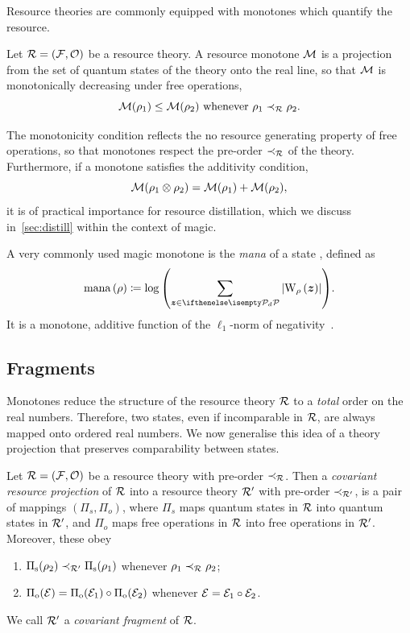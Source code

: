 \documentclass[pra,
aps,
twocolumn,
superscriptaddress,
groupedaddress,
nofootinbib,
reprint
]{revtex4-1}
\begin{document}
Resource theories are commonly equipped with monotones which quantify the resource. 
\begin{definition}\label{def:mono}
    Let $\mathcal{R} = (\mathcal{F}, \mathcal{O})$ be a resource theory.
    A resource monotone $\mathcal{M}$ is a projection from the set of quantum states of the theory onto the real line, so that $\mathcal{M}$ is monotonically decreasing under free operations,
    \begin{equation}
        \mathcal{M}(\rho_1) \leq \mathcal{M}(\rho_2)\ \text{whenever}\ \rho_1 \prec_{\mathcal{R}} \rho_2.
    \end{equation}
\end{definition}
The monotonicity condition reflects the no resource generating property of free operations, so that monotones respect the pre-order $\prec_{\mathcal{R}}$ of the theory.
Furthermore, if a monotone satisfies the additivity condition,
\begin{equation}
    \mathcal{M}(\rho_1 \otimes \rho_2) = \mathcal{M}(\rho_1) + \mathcal{M}(\rho_2),
\end{equation}
it is of practical importance for resource distillation, which we discuss in~\cref{sec:distill} within the context of magic.

A very commonly used magic monotone is the \emph{mana} of a state , defined as
\begin{equation}
    \mana{\rho} \coloneqq \log{\left(\sum\limits_{\bmz \in \pd} \abs{\W[\bmz]{\rho}}\right)}.
\end{equation}
It is a monotone, additive function of the $\ell_1$-norm of negativity~.

\subsection{Fragments}

Monotones reduce the structure of the resource theory $\mathcal{R}$ to a \emph{total} order on the real numbers.
Therefore, two states, even if incomparable in $\mathcal{R}$, are always mapped onto ordered real numbers.
We now generalise this idea of a theory projection that preserves comparability between states. 
\begin{definition}\label{def:covproj}
Let $\mathcal{R} = (\mathcal{F}, \mathcal{O})$ be a resource theory with pre-order $\prec_{\mathcal{R}}$. 
Then a \emph{covariant resource projection} of $\mathcal{R}$ into a resource theory $\mathcal{R}'$ with pre-order $\prec_{\mathcal{R}'}$, is a pair of mappings $(\Pi_s, \Pi_o)$, where $\Pi_s$ maps quantum states in $\mathcal{R}$ into quantum states in $\mathcal{R}'$, and $\Pi_o$ maps free operations in $\mathcal{R}$ into free operations in $\mathcal{R}'$. 
Moreover, these obey
	\begin{enumerate}
        \item $\Pi_{\rm{s}}(\rho_2) \prec_{\mathcal{R}'} \Pi_{\rm{s}}(\rho_1)$ whenever $\rho_1 \prec_{\mathcal{R}} \rho_2$;
        \item $\Pi_{\rm{o}}(\mathcal{E}) = \Pi_{\rm{o}}(\mathcal{E}_1) \circ \Pi_{\rm{o}}(\mathcal{E}_2)$ whenever $\mathcal{E} = \mathcal{E}_1 \circ \mathcal{E}_2$.
    \end{enumerate}
We call $\mathcal{R}'$ a \emph{covariant fragment} of $\mathcal{R}$.
\end{definition}
\end{document}
